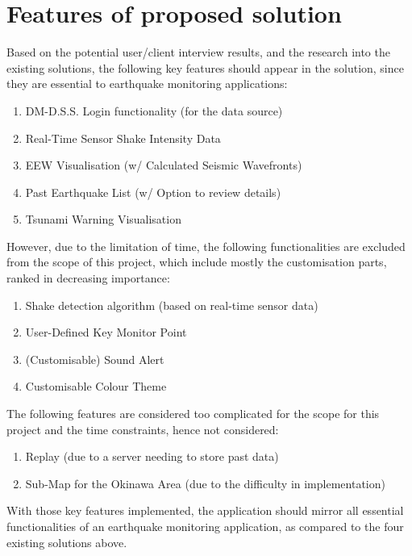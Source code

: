 

\section{Features of proposed solution}

Based on the potential user/client interview results, and the research into the existing solutions, the following key features should appear in the solution, since they are essential to earthquake monitoring applications:
\begin{enumerate}
    \item DM-D.S.S. Login functionality (for the data source)
    \item Real-Time Sensor Shake Intensity Data
    \item EEW Visualisation (w/ Calculated Seismic Wavefronts)
    \item Past Earthquake List (w/ Option to review details)
    \item Tsunami Warning Visualisation
\end{enumerate}

However, due to the limitation of time, the following functionalities are excluded from the scope of this project, which include mostly the customisation parts, ranked in decreasing importance:
\begin{enumerate}
    \item Shake detection algorithm (based on real-time sensor data)
    \item User-Defined Key Monitor Point
    \item (Customisable) Sound Alert
    \item Customisable Colour Theme
\end{enumerate}

The following features are considered too complicated for the scope for this project and the time constraints, hence not considered:
\begin{enumerate}
    \item Replay (due to a server needing to store past data)
    \item Sub-Map for the Okinawa Area (due to the difficulty in implementation)
\end{enumerate}

With those key features implemented, the application should mirror all essential functionalities of an earthquake monitoring application, as compared to the four existing solutions above.

